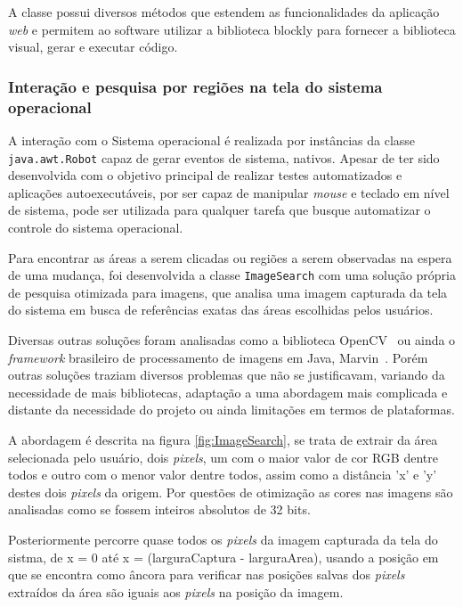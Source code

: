 \documentclass[tg]{mdtufsm}
\begin{document}
                    A classe possui diversos métodos que estendem as funcionalidades da aplicação \emph{web} e permitem ao software utilizar a biblioteca blockly para fornecer a biblioteca visual, gerar e executar código.

                \subsubsection {Interação e pesquisa por regiões na tela do sistema operacional}

                    A interação com o Sistema operacional é realizada por instâncias da classe \texttt{java.awt.Robot} capaz de gerar eventos de sistema, nativos. Apesar de ter sido desenvolvida com o objetivo principal de realizar testes automatizados e aplicações autoexecutáveis, por ser capaz de manipular \emph{mouse} e teclado em nível de sistema, pode ser utilizada para qualquer tarefa que busque automatizar o controle do sistema operacional.

                    Para encontrar as áreas a serem clicadas ou regiões a serem observadas na espera de uma mudança, foi desenvolvida a classe \texttt{ImageSearch} com uma solução própria de pesquisa otimizada para imagens, que analisa uma imagem capturada da tela do sistema em busca de referências exatas das áreas escolhidas pelos usuários.

                    Diversas outras soluções foram analisadas como a biblioteca OpenCV~\cite{openCV} ou ainda o \emph{framework} brasileiro de processamento de imagens em Java, Marvin~\cite{marvin}. Porém outras soluções traziam diversos problemas que não se justificavam, variando da necessidade de mais bibliotecas, adaptação a uma abordagem mais complicada e distante da necessidade do projeto ou ainda limitações em termos de plataformas.

                    A abordagem é descrita na figura \ref{fig:ImageSearch}, se trata de extrair da área selecionada pelo usuário, dois \emph{pixels}, um com o maior valor de cor RGB dentre todos e outro com o menor valor dentre todos, assim como a distância 'x' e 'y' destes dois \emph{pixels} da origem. Por questões de otimização as cores nas imagens são analisadas como se fossem inteiros absolutos de 32 bits.

                    Posteriormente percorre quase todos os \emph{pixels} da imagem capturada da tela do sistma, de x = 0 até x = (larguraCaptura - larguraArea), usando a posição em que se encontra como âncora para verificar nas posições salvas dos \emph{pixels} extraídos da área são iguais aos \emph{pixels} na posição da imagem.
\end{document}
